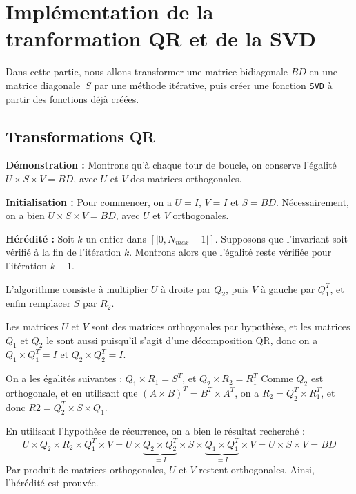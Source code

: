 \section{Implémentation de la tranformation QR et de la SVD}
Dans cette partie, nous allons transformer une matrice bidiagonale $BD$ en une matrice diagonale~$S$ par une méthode itérative,
puis créer une fonction \verb|SVD| à partir des fonctions déjà créées.

\subsection{Transformations QR}

\bigbreak
\noindent\textbf{Démonstration :}
Montrons qu'à chaque tour de boucle, on conserve l'égalité $U \times S \times V = BD$, avec $U$ et $V$ des matrices orthogonales.
	
	\medbreak\noindent
	\textbf{Initialisation :} Pour commencer, on a $U = I$, $V = I$ et $S = BD$. 
	Nécessairement, on a bien $U \times S \times V = BD$, avec $U$ et $V$ orthogonales.

	\medbreak\noindent
	\textbf{Hérédité :} Soit $k$ un entier dans $[|0, N_{max} - 1|]$. Supposons que l'invariant soit vérifié à la fin de l'itération $k$.
	Montrons alors que l'égalité reste vérifiée pour l'itération $k + 1$.

	L'algorithme consiste à multiplier $U$ à droite par $Q_2$, puis $V$ à gauche par $Q_1^T$, 
	et enfin remplacer $S$ par $R_2$.

	Les matrices $U$ et $V$ sont des matrices orthogonales par hypothèse, et les matrices $Q_1$ et $Q_2$ le sont aussi puisqu'il s'agit d'une décomposition QR,
	donc on a $Q_1 \times Q_1^T = I$ et $Q_2 \times Q_2^T = I$.

	On a les égalités suivantes : $Q_1 \times R_1 = S^T$, et $Q_2 \times R_2 = R_1^T$
	Comme $Q_2$ est orthogonale, et en utilisant que $(A \times B)^T = B^T \times A^T$, on a $R_2 = Q_2^T \times R_1^T$, et donc $R2 = Q_2^T \times S \times Q_1$.

	En utilisant l'hypothèse de récurrence, on a bien le résultat recherché :
	\begin{equation*}
		U \times Q_2 \times R_2 \times Q_1^T \times V = U \times \underbrace{Q_2 \times Q_2^T}_{= I} \times S \times \underbrace{Q_1 \times Q_1^T}_{= I} \times V = U \times S \times V = BD
	\end{equation*}
	Par produit de matrices orthogonales, $U$ et $V$ restent orthogonales. 
	Ainsi, l'hérédité est prouvée.

